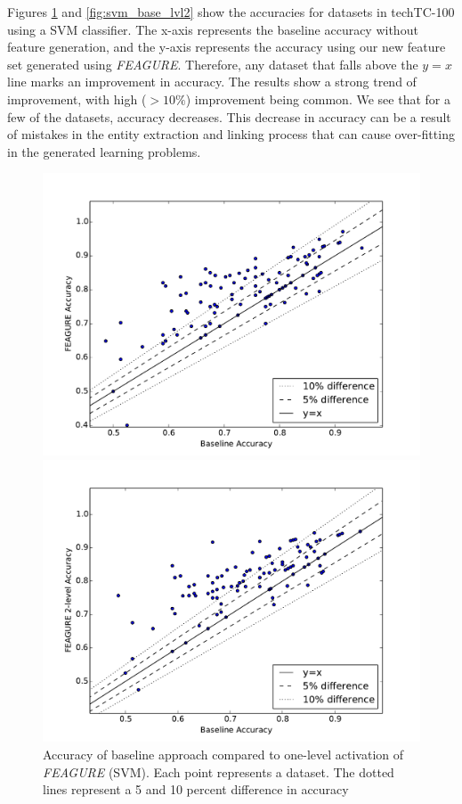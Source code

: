 \documentclass[twoside,11pt]{article}
\theoremstyle{definition}
\begin{document}
Figures \ref{fig:svm_base_lvl1} and \ref{fig:svm_base_lvl2} show the accuracies for datasets in techTC-100 using a SVM classifier. The x-axis represents the baseline accuracy without feature generation, and the y-axis represents the accuracy using our new feature set generated using \emph{FEAGURE}. Therefore, any dataset that falls above the $y=x$ line marks an improvement in accuracy. 
The results show a strong trend of improvement, with high ($>10\%$) improvement being common.
We see that for a few of the datasets, accuracy decreases. This decrease in accuracy can be a result of mistakes in the entity extraction and linking process that can cause over-fitting in the generated learning problems.

\begin{figure}
	\centering
	\begin{minipage}{0.45\textwidth}
		\centering
		\includegraphics[width=1.2\textwidth]{svm_full} %
		\caption{Accuracy of
			baseline approach compared to one-level activation of \emph{FEAGURE} (SVM). Each point represents a dataset. The dotted lines represent a 5 and 10 percent difference in accuracy}
		\label{fig:svm_base_lvl1}
	\end{minipage}\hfill
	\begin{minipage}{0.45\textwidth}
		\centering
		\includegraphics[width=1.2\textwidth]{svm_full_lvl2} %

\end{minipage}
\end{figure}
\end{document}
